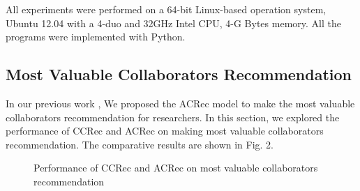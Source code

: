 \documentclass{acm_proc_article-sp}
\begin{document}
All experiments were performed on a 64-bit Linux-based operation system, Ubuntu 12.04 with a 4-duo and 32GHz Intel CPU, 4-G Bytes memory. All the programs were implemented with Python.

\subsection{Most Valuable Collaborators Recommendation}
In our previous work \cite{li2014acrec}, We proposed the ACRec model to make the most valuable collaborators recommendation for researchers. In this section, we explored the performance of CCRec and ACRec on making most valuable collaborators recommendation. The comparative results are shown in Fig. 2.

\begin{figure}
\centering
{}
\caption{Performance of CCRec and ACRec on most valuable collaborators recommendation}
\label{fig:2}
\end{figure}
\end{document}
